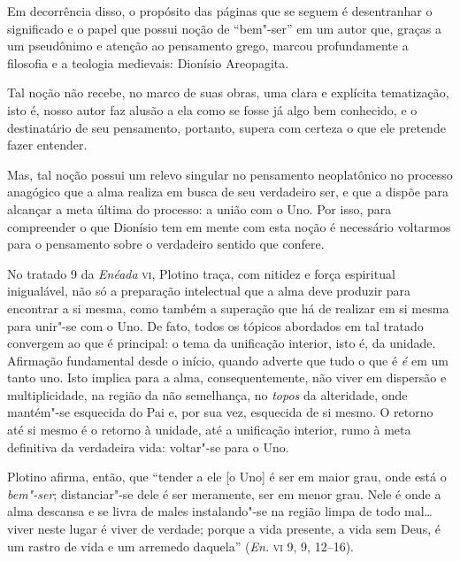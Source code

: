 Em decorrência disso, o propósito das páginas que se seguem é desentranhar 
o significado e o papel que possui noção de ``bem"-ser'' em um autor que,
graças a um pseudônimo e atenção ao pensamento grego, marcou profundamente a
filosofia e a teologia medievais: Dionísio Areopagita.

Tal noção não recebe, no marco de suas obras, uma clara e explícita tematização,
isto é, nosso autor faz alusão a ela como se fosse já algo bem conhecido, e o
destinatário de seu pensamento, portanto, supera com certeza o que ele pretende
fazer entender. 

Mas, tal noção possui um relevo singular no pensamento neoplatônico no processo
anagógico que a alma realiza em busca de seu verdadeiro ser, e que a dispõe para
alcançar a meta última do processo: a união com o Uno. Por isso, para
compreender o que Dionísio tem em mente com esta noção é necessário voltarmos
para o pensamento sobre o verdadeiro sentido que confere. 

No tratado 9 da \textit{Enéada} \textsc{vi}, Plotino traça, com nitidez e força
espiritual inigualável, não só a preparação intelectual que a alma deve produzir
para encontrar a si mesma, como também a superação que há de realizar em si
mesma para unir"-se com o Uno. De fato, todos os tópicos abordados em tal tratado
convergem ao que é principal: o tema da unificação interior, isto é, da unidade.
Afirmação fundamental desde o início, quando adverte que tudo o que é \textit{é}
em um tanto uno. Isto implica para a alma, consequentemente, não viver em
dispersão e multiplicidade, na região da não semelhança, no \textit{topos} 
da alteridade, onde mantém"-se esquecida do Pai e, por sua vez, esquecida de si
mesmo. O retorno até si mesmo é o retorno à unidade, até a unificação interior,
rumo à meta definitiva da verdadeira vida: voltar"-se para o Uno.

Plotino afirma, então, que ``tender a ele [o Uno] é ser em maior grau, onde está
o \textit{bem"-ser}; distanciar"-se dele é ser meramente, ser em menor grau.  Nele
é onde a alma descansa e se livra de males instalando"-se na região limpa de todo
mal\ldots{} viver neste lugar é viver de verdade; porque a vida presente, a vida
sem Deus, é um rastro de vida e um arremedo daquela'' (\textit{En.} \textsc{vi}
9, 9, 12--16).

